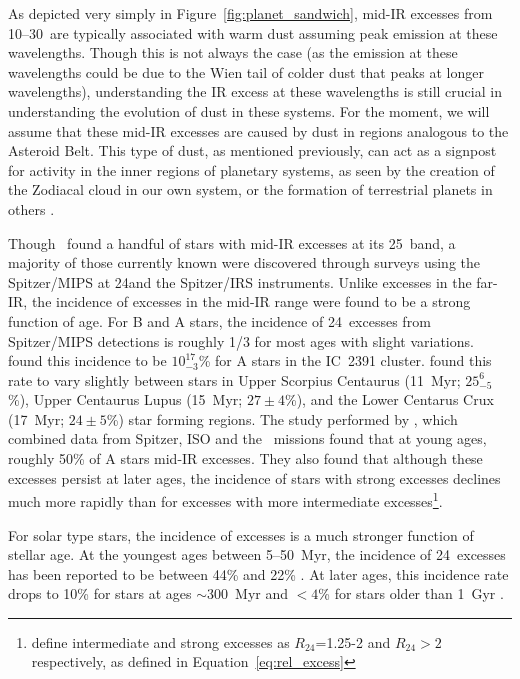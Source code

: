    As depicted very simply in Figure~\ref{fig:planet_sandwich}, mid-IR excesses from 10--30\micron\ are typically associated with warm dust assuming peak emission at these wavelengths. Though this is not always the case (as the emission at these wavelengths could be due to the Wien tail of colder dust that peaks at longer wavelengths), understanding the IR excess at these wavelengths is still crucial in understanding the evolution of dust in these systems. For the moment, we will assume that these mid-IR excesses are caused by dust in regions analogous to the Asteroid Belt. This type of dust, as mentioned previously, can act as a signpost for activity in the inner regions of planetary systems, as seen by the creation of the Zodiacal cloud in our own system, or the formation of terrestrial planets in others \citep{Song2005}. 
   
   Though \iras\ found a handful of stars with mid-IR excesses at its 25\micron\ band, a majority of those currently known were discovered through surveys using the Spitzer/MIPS at 24\micron and the Spitzer/IRS instruments. Unlike excesses in the far-IR, the incidence of excesses in the mid-IR range were found to be a strong function of age. For B and A stars, the incidence of 24\micron\ excesses from Spitzer/MIPS detections is roughly 1/3 for most ages \citep{Wyatt2008} with slight variations. \citet{Siegler2007} found this incidence to be $10^{17}_{-3}$\% for A stars in the IC~2391 cluster. \citet{Chen2012} found this rate to vary slightly between stars in Upper Scorpius Centaurus (11~Myr; $25^{6}_{-5}$\%), Upper Centaurus Lupus (15~Myr; $27 \pm 4$\%), and the Lower Centarus Crux (17~Myr; $24 \pm 5$\%) star forming regions. The study performed by \citet{Rieke2005}, which combined data from Spitzer, ISO and the \iras\ missions found that at young ages, roughly 50\% of A stars mid-IR excesses. They also found that although these excesses persist at later ages, the incidence of stars with strong excesses declines much more rapidly than for excesses with more intermediate excesses\footnote{\citet{Rieke2005} define intermediate and strong excesses as $R_{24}$=1.25-2 and $R_{24}>2$ respectively, as defined in Equation~\ref{eq:rel_excess}}.

   For solar type stars, the incidence of excesses is a much stronger function of stellar age. At the youngest ages between 5--50~Myr, the incidence of 24\micron\ excesses has been reported to be between 44\% and 22\% \citep{Siegler2007, Chen2012}. At later ages, this incidence rate drops to 10\% for stars at ages $\sim$300~Myr \citep{Meyer2008} and $<4$\% for stars older than 1~Gyr \citep{Trilling2008}. 
   
